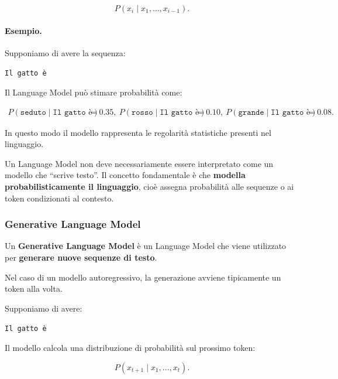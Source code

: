 \begin{equation}
P(x_i\mid x_1,\ldots,x_{i-1}).
\end{equation}

\paragraph{Esempio.}

Supponiamo di avere la sequenza:

\begin{center}
\texttt{Il gatto è}
\end{center}

Il Language Model può stimare probabilità come:

\begin{align}
P(\texttt{seduto}\mid \texttt{Il gatto è}) &= 0.35,\
P(\texttt{rosso}\mid \texttt{Il gatto è}) &= 0.10,\
P(\texttt{grande}\mid \texttt{Il gatto è}) &= 0.08.
\end{align}

In questo modo il modello rappresenta le regolarità statistiche presenti nel linguaggio.

\begin{warning}
Un Language Model non deve necessariamente essere interpretato come un modello che ``scrive testo''. Il concetto fondamentale è che \textbf{modella probabilisticamente il linguaggio}, cioè assegna probabilità alle sequenze o ai token condizionati al contesto.
\end{warning}

\subsubsection{Generative Language Model}

Un \textbf{Generative Language Model} è un Language Model che viene utilizzato per \textbf{generare nuove sequenze di testo}.

Nel caso di un modello autoregressivo, la generazione avviene tipicamente un token alla volta.

Supponiamo di avere:

\begin{center}
\texttt{Il gatto è}
\end{center}

Il modello calcola una distribuzione di probabilità sul prossimo token:

\begin{equation}
P(x_{t+1}\mid x_1,\ldots,x_t).
\end{equation}

